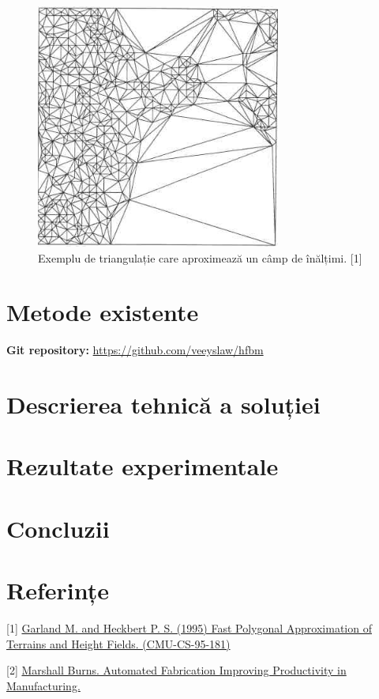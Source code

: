 \documentclass[12pt]{article}
\begin{document}
\begin{figure}[!htb]
	\begin{minipage}{0.32\textwidth}
		\centering
		\includegraphics[width=.7\linewidth]{ExempluTriangulatieCuAproximari.png}
		\caption{Exemplu de triangulație care aproximează un câmp de înălțimi. [1]}\label{fig:fig3}
	\end{minipage}
\end{figure}

\newpage
\vspace{10cm}
\section{Metode existente}

\textbf{Git repository:} \url{https://github.com/veeyslaw/hfbm}



\section{Descrierea tehnică a soluției}




\section{Rezultate experimentale}



\section{Concluzii}



\section*{Referințe}

\medskip

[1] \href{http://reports-archive.adm.cs.cmu.edu/anon/anon/home/ftp/1995/CMU-CS-95-181.pdf} {Garland M. and Heckbert P. S. (1995) Fast Polygonal Approximation of Terrains and Height Fields. (CMU-CS-95-181)}

[2] \href{https://www.fabbers.com/tech/STL_Format#Sct_binary} {Marshall Burns. Automated Fabrication
Improving Productivity in Manufacturing.}
\end{document}
